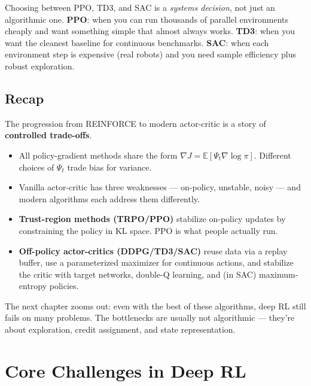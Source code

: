 \documentclass[11pt, oneside]{book}
\newcommand{\E}{\mathbb{E}}              %
\begin{document}
\begin{intbox}
Choosing between PPO, TD3, and SAC is a \emph{systems decision}, not just an
algorithmic one.
\textbf{PPO}: when you can run thousands of parallel environments cheaply and want
something simple that almost always works.
\textbf{TD3}: when you want the cleanest baseline for continuous benchmarks.
\textbf{SAC}: when each environment step is expensive (real robots) and you need
sample efficiency plus robust exploration.
\end{intbox}

\section{Recap}

The progression from REINFORCE to modern actor-critic is a story of \textbf{controlled
trade-offs}.

\begin{itemize}
  \item All policy-gradient methods share the form
    $\nabla J = \E[\Psi_t \nabla \log \pi]$.
    Different choices of $\Psi_t$ trade bias for variance.
  \item Vanilla actor-critic has three weaknesses --- on-policy, unstable, noisy ---
    and modern algorithms each address them differently.
  \item \textbf{Trust-region methods (TRPO/PPO)} stabilize on-policy updates by
    constraining the policy in KL space. PPO is what people actually run.
  \item \textbf{Off-policy actor-critics (DDPG/TD3/SAC)} reuse data via a replay buffer,
    use a parameterized maximizer for continuous actions, and stabilize the critic with
    target networks, double-Q learning, and (in SAC) maximum-entropy policies.
\end{itemize}

The next chapter zooms out: even with the best of these algorithms, deep RL still fails
on many problems. The bottlenecks are usually not algorithmic --- they're about
exploration, credit assignment, and state representation.


\chapter{Core Challenges in Deep RL}
\end{document}
